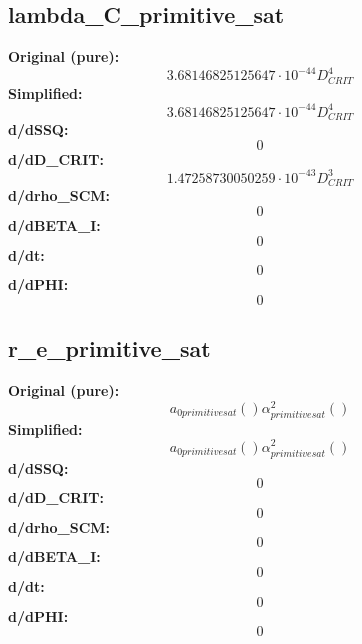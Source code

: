 \subsection{lambda_C_primitive_sat}
\textbf{Original (pure):}
\begin{equation}
3.68146825125647 \cdot 10^{-44} D_{CRIT}^{4}
\end{equation}
\textbf{Simplified:}
\begin{equation}
3.68146825125647 \cdot 10^{-44} D_{CRIT}^{4}
\end{equation}
\textbf{d/dSSQ:}
\begin{equation}
0
\end{equation}
\textbf{d/dD_CRIT:}
\begin{equation}
1.47258730050259 \cdot 10^{-43} D_{CRIT}^{3}
\end{equation}
\textbf{d/drho_SCM:}
\begin{equation}
0
\end{equation}
\textbf{d/dBETA_I:}
\begin{equation}
0
\end{equation}
\textbf{d/dt:}
\begin{equation}
0
\end{equation}
\textbf{d/dPHI:}
\begin{equation}
0
\end{equation}

\subsection{r_e_primitive_sat}
\textbf{Original (pure):}
\begin{equation}
a_{0 primitive sat}{\left( \right)} \alpha_{primitive sat}^{2}{\left( \right)}
\end{equation}
\textbf{Simplified:}
\begin{equation}
a_{0 primitive sat}{\left( \right)} \alpha_{primitive sat}^{2}{\left( \right)}
\end{equation}
\textbf{d/dSSQ:}
\begin{equation}
0
\end{equation}
\textbf{d/dD_CRIT:}
\begin{equation}
0
\end{equation}
\textbf{d/drho_SCM:}
\begin{equation}
0
\end{equation}
\textbf{d/dBETA_I:}
\begin{equation}
0
\end{equation}
\textbf{d/dt:}
\begin{equation}
0
\end{equation}
\textbf{d/dPHI:}
\begin{equation}
0
\end{equation}

